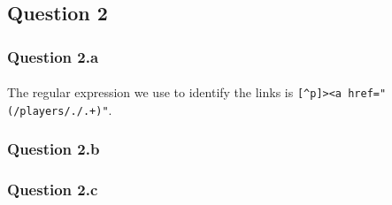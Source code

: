 
\subsection{Question 2}
\label{subsec:312}

\subsubsection{Question 2.a}
\label{subsubsec:312a}
\paragraph{} The regular expression we use to identify the links is \verb|[^p]><a href="(/players/./.+)"|.

\subsubsection{Question 2.b}
\label{subsubsec:312b}

\subsubsection{Question 2.c}
\label{subsubsec:312c}